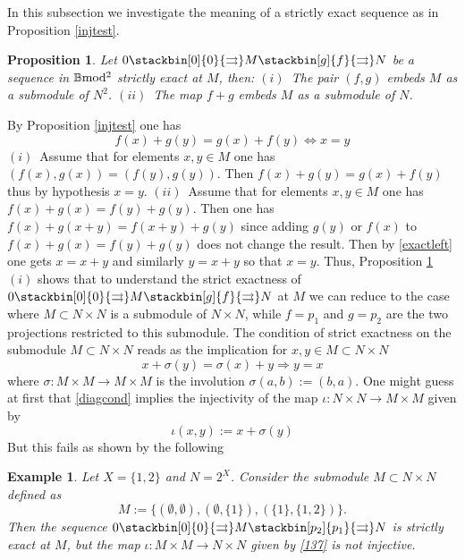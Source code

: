 \documentclass[12pt]{article}
\newtheorem{prop}[thm]{Proposition}
\newtheorem{example}[thm]{Example}
\def\B{{\mathbb B}}
\def\strg{strict }
\def\strgly{strictly }
\def\bm2{{\rm \B mod^2}}
\begin{document}
In this subsection we investigate the meaning of a  \strgly exact sequence as in Proposition \ref{injtest}.
\begin{prop}\label{injN} Let  $0 \stackbin[0]{0}{\rightrightarrows}M\stackbin[g]{f}{\rightrightarrows}N$ be a sequence in $\bm2$  \strgly exact at $M$, then:\newline
 $(i)$~The pair $(f,g)$ embeds $M$ as a submodule of $N^2$.\newline
 $(ii)$~The map $f+g$ embeds $M$ as a submodule of $N$.	
\end{prop}
\proof By Proposition \ref{injtest} one has 
\begin{equation}\label{exactleft}
	f(x)+g(y)=g(x)+f(y)\iff x=y
\end{equation}
$(i)$~Assume that for elements $x,y\in M$ one has $(f(x),g(x))=(f(y),g(y))$. Then $f(x)+g(y)=g(x)+f(y)$ thus by hypothesis $x=y$.\newline
$(ii)$~Assume that for elements $x,y\in M$ one has $f(x)+g(x)=f(y)+g(y)$. Then one has $f(x)+g(x+y)=f(x+y)+g(y)$ since adding $g(y)$ or $f(x)$ to $f(x)+g(x)=f(y)+g(y)$ does not change the result. Then by \eqref{exactleft} one gets $x=x+y$ and similarly $y=x+y$ so that $x=y$.\endproof
Thus, Proposition \ref{injN} $(i)$ shows that to understand the \strg exactness of  $0 \stackbin[0]{0}{\rightrightarrows}M\stackbin[g]{f}{\rightrightarrows}N$ at $M$ we can reduce to the case where $M\subset N\times N$ is a submodule of $N\times N$, while $f=p_1$ and $g=p_2$ are the two projections restricted to this submodule. \vspace{.05in}
The condition of \strg exactness on the submodule $M\subset N\times N$ reads as the implication for $x,y\in M\subset N\times N$
\begin{equation}\label{diagcond}
 x+\sigma(y)=\sigma(x)+y\Rightarrow y=x	
\end{equation}
where $\sigma:M\times M\to M\times M$ is the involution $\sigma(a,b):=(b,a)$.
One might guess at first  that \eqref{diagcond} implies the injectivity of the map  $\iota:N\times N\to M\times M$ given by
\begin{equation}\label{137}
	\iota(x,y):=x+\sigma(y)
\end{equation}
 But this fails as shown by the following
\begin{example}\label{example not mono}
	Let $X=\{1,2\}$ and  $N=2^X$. Consider the submodule $M\subset N\times N$ defined as
\begin{equation}\label{138}
M:=\{(\emptyset,\emptyset), (\emptyset,\{1\}),(\{1\},\{1,2\})\}.
\end{equation}
Then the sequence $0 \stackbin[0]{0}{\rightrightarrows}M\stackbin[p_2]{p_1}{\rightrightarrows}N$ is \strgly exact at $M$, but the map  $\iota:M\times M\to N\times N$ given by \eqref{137} is not injective.
\end{example}
\end{document}
